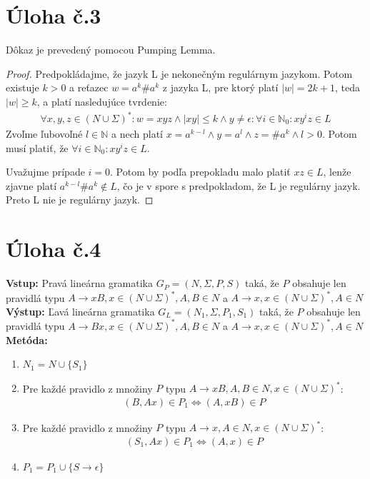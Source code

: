 \documentclass[10pt]{article}
\begin{document}
\section*{Úloha č.3}
Dôkaz je prevedený pomocou Pumping Lemma. 
\begin{proof}
Predpokládajme, že jazyk L je nekonečným regulárnym jazykom. Potom existuje $k > 0$ a reťazec $w =
a^k\#a^k$ z jazyka L, pre ktorý platí $|w| = 2k+1$, teda $|w|\geq k$, a platí nasledujúce tvrdenie:
\begin{align*}
    \forall x,y,z \in (N \cup \Sigma)^*: w = xyz \land |xy| \leq k \land y \neq \epsilon : \forall i \in
    \mathbb{N}_0: xy^iz \in L 
\end{align*}
    Zvoľme ľubovoľné $l\in \mathbb{N}$ a nech platí $x = a^{k-l} \land y = a^{l} \land z = \#a^k \land l > 0$. Potom musí platiť, že $\forall
i \in \mathbb{N}_0: xy^iz \in L$.

Uvažujme prípade $i = 0$. Potom by podľa prepokladu malo platiť $xz \in L$, lenže zjavne platí
    $a^{k-l}\#a^{k} \notin L$, čo je v spore s predpokladom, že L je regulárny jazyk. Preto L nie je regulárny jazyk.
\end{proof}


\section*{Úloha č.4}

\textbf{Vstup:} Pravá lineárna gramatika $G_P = (N, \Sigma, P, S)$ taká, že $P$ obsahuje len pravidlá typu
$A\to xB, x \in (N\cup\Sigma)^*, A,B \in N$ a $A\to x, x \in (N\cup\Sigma)^*, A \in N$\\
\textbf{Výstup:} Ľavá lineárna gramatika $G_L = (N_1, \Sigma, P_1, S_1)$ taká, že $P$ obsahuje len pravidlá typu
$A\to Bx, x \in (N\cup\Sigma)^*, A,B \in N$ a $A\to x, x \in (N\cup\Sigma)^*, A \in N$\\
\textbf{Metóda:}
\begin{enumerate}
    \item $N_1 = N \cup \{S_1\}$
    \item Pre každé pravidlo z množiny $P$ typu $A\to xB, A,B \in N, x \in (N\cup\Sigma)^*$:\\
        \begin{align*}
            (B,Ax) \in P_1 \iff (A, xB) \in P
        \end{align*}
    \item Pre každé pravidlo z množiny $P$ typu $A\to x, A \in N, x \in (N\cup\Sigma)^*$:\\
        \begin{align*}
            (S_1,Ax) \in P_1 \iff (A, x) \in P
        \end{align*}
    \item $P_1 = P_1 \cup \{S\to\epsilon\}$
\end{enumerate}
\end{document}
